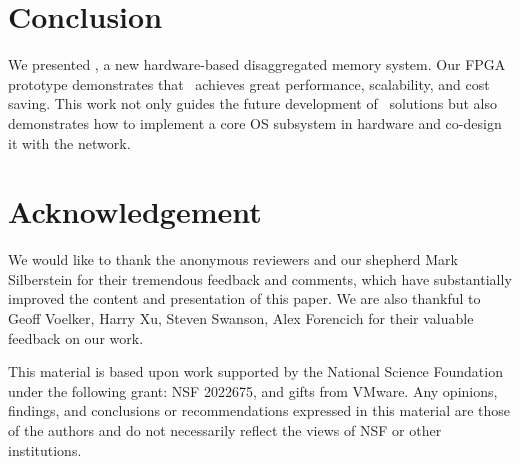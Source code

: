 \section{Conclusion}
\label{sec:conclude}

We presented \sys, a new hardware-based disaggregated memory system.
Our FPGA prototype demonstrates that \sys\ achieves great performance, scalability, and cost saving.
This work not only guides the future development of \md\ solutions
but also demonstrates how to implement a core OS subsystem in hardware and co-design it with the network.
%
\fi

\section*{Acknowledgement}

We would like to thank the anonymous reviewers and our shepherd Mark Silberstein
for their tremendous feedback and comments, which have
substantially improved the content and presentation of this paper.
We are also thankful to Geoff Voelker, Harry Xu, Steven Swanson, Alex Forencich for their valuable feedback on our work.

This material is based upon work supported by the National
Science Foundation under the following grant: NSF 2022675, and gifts from VMware.
Any opinions, findings, and conclusions or recommendations
expressed in this material are those of the authors and do not 
necessarily reflect the views of NSF or other institutions.



%